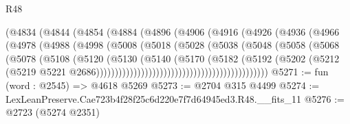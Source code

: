 \begin{lexlean}{R48}
\begin{coremodule}
                                  (@4834
                                    (@4844
                                      (@4854
                                        (@4884
                                          (@4896
                                            (@4906
                                              (@4916
                                                (@4926
                                                  (@4936
                                                    (@4966
                                                      (@4978
                                                        (@4988
                                                          (@4998
                                                            (@5008
                                                              (@5018
                                                                (@5028
                                                                  (@5038
                                                                    (@5048
                                                                      (@5058
                                                                        (@5068
                                                                          (@5078
                                                                            (@5108
                                                                              (@5120
                                                                                (@5130
                                                                                  (@5140
                                                                                    (@5170
                                                                                      (@5182
                                                                                        (@5192
                                                                                          (@5202
                                                                                            (@5212
                                                                                              (@5219
                                                                                                @5221
                                                                                                @2686))))))))))))))))))))))))))))))))))))))))))))))
@5271 := fun (word : @2545) => @4618 @5269
@5273 := @2704 @315 @4499
@5274 := LexLeanPreserve.Cae723b4f28f25c6d220e7f7d64945ed3.R48.__fits_11
@5276 := @2723 (@5274 @2351)

\end{coremodule}
\end{lexlean}
